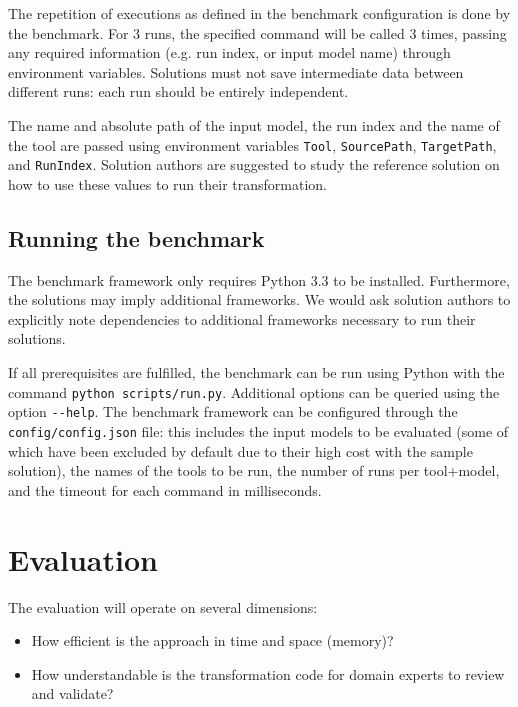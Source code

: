 \documentclass[a4paper]{scrartcl}
\newcommand*{\file}[1]{\texttt{#1}}
\begin{document}
The repetition of executions as defined in the benchmark configuration is done
by the benchmark. For 3 runs, the specified command will be called 3 times,
passing any required information (e.g. run index, or input model name) through
environment variables. Solutions must not save intermediate data between
different runs: each run should be entirely independent.

The name and absolute path of the input model, the run index and the name of the
tool are passed using environment variables \file{Tool}, \file{SourcePath},
\file{TargetPath}, and \file{RunIndex}.
Solution authors are suggested to study the reference solution on how to use
these values to run their transformation.

\subsection{Running the benchmark}
\label{sec:running-benchmark}

The benchmark framework only requires Python 3.3 to be installed. Furthermore,
the solutions may imply additional frameworks. We would ask solution authors to
explicitly note dependencies to additional frameworks necessary to run their
solutions.

If all prerequisites are fulfilled, the benchmark can be run using Python with
the command \file{python scripts/run.py}. Additional options can be queried
using the option \file{{-}{-}help}. The benchmark framework can be configured
through the \file{config/config.json} file: this includes the input models to be
evaluated (some of which have been excluded by default due to their high cost
with the sample solution), the names of the tools to be run, the number of runs
per tool+model, and the timeout for each command in milliseconds.

\section{Evaluation}
\label{sec:evaluation}

The evaluation will operate on several dimensions:

\begin{itemize}
\item How efficient is the approach in time and space (memory)?

\item How understandable is the transformation code for domain experts to review and validate?
\end{itemize}



\end{document}
